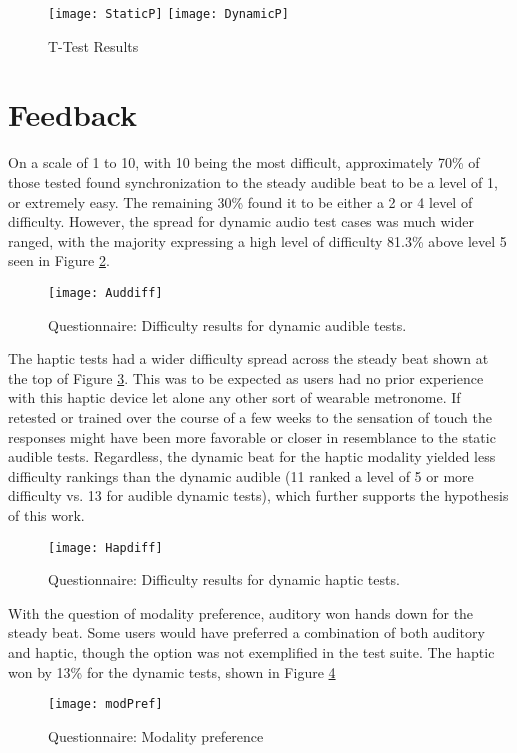 \begin{figure}[H]
    \centering
    \texttt{[image: StaticP]}
    \texttt{[image: DynamicP]}
    \caption{T-Test Results}
    \label{fig:pvalue}
\end{figure}
\section{Feedback}
On a scale of 1 to 10, with 10 being the most difficult, approximately 70\% of those tested found synchronization to the steady audible beat to be a level of 1, or extremely easy. The remaining 30\% found it to be either a 2 or 4 level of difficulty. However, the spread for dynamic audio test cases was much wider ranged, with the majority expressing a high level of difficulty 81.3\% above level 5 seen in Figure \ref{fig:Auddiff}.

\begin{figure}[H]
    \centering
    \texttt{[image: Auddiff]}
    \caption{Questionnaire: Difficulty results for dynamic audible tests.}
    \label{fig:Auddiff}
\end{figure}

The haptic tests had a wider difficulty spread across the steady beat shown at the top of Figure \ref{fig:Hapdiff}. This was to be expected as users had no prior experience with this haptic device let alone any other sort of wearable metronome. If retested or trained over the course of a few weeks to the sensation of touch the responses might have been more favorable or closer in resemblance to the static audible tests. Regardless, the dynamic beat for the haptic modality yielded less difficulty rankings than the dynamic audible (11 ranked a level of 5 or more difficulty vs. 13 for audible dynamic tests), which further supports the hypothesis of this work.
\begin{figure}[H]
    \centering
    \texttt{[image: Hapdiff]}
    \caption{Questionnaire: Difficulty results for dynamic haptic tests.}
    \label{fig:Hapdiff}
\end{figure}

With the question of modality preference, auditory won hands down for the steady beat. Some users would have preferred a combination of both auditory and haptic, though the option was not exemplified in the test suite. The haptic won by 13\% for the dynamic tests, shown in Figure \ref{fig:modPref}
\begin{figure}[H]
    \centering
    \texttt{[image: modPref]}
    \caption{Questionnaire: Modality preference}
    \label{fig:modPref}
\end{figure}

